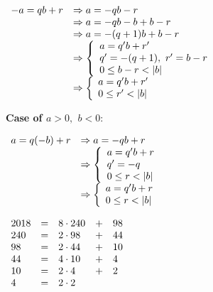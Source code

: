 \documentclass[a4paper, 11pt]{article}
\begin{document}
\begin{myEnumerate}
    \(
    \begin{array}{ll}
    	-a = qb + r & \Rightarrow a = -qb - r \\
        			& \Rightarrow a = -qb - b + b - r \\
                    & \Rightarrow a = -(q + 1)b + b - r \\
                    & \Rightarrow 
        \left\{
    		\begin{array}{ll}
        		a = q'b + r' \\
        		q' = -(q + 1), \textnormal{ } r' = b - r \\
                0 \leq b - r < |b|
    		\end{array}
		\right. \\
        			& \Rightarrow 
        \left\{
    		\begin{array}{ll}
        		a = q'b + r' \\
                0 \leq r' < |b|
    		\end{array}
		\right.
    \end{array} \\ \)

	\textbf{Case of $a > 0,$ $b < 0:$}
    
    \(
    \begin{array}{ll}
    	a = q(-b) + r & \Rightarrow a = -qb + r \\
                      & \Rightarrow 
        \left\{
    		\begin{array}{ll}
        		a = q'b + r \\
        		q' = -q \\
                0 \leq r < |b|
    		\end{array}
		\right. \\
        			& \Rightarrow 
        \left\{
    		\begin{array}{ll}
        		a = q'b + r \\
                0 \leq r < |b|
    		\end{array}
		\right.
    \end{array} \\ \)
    
	\item
	\begin{myEnumerate}
    	\item
        \( \\
        \begin{array}{lllll}
        	2018 & = & 8 \cdot 240 & + & 98 \\
        	240  & = & 2 \cdot 98  & + & 44 \\
            98   & = & 2 \cdot 44  & + & 10 \\
            44   & = & 4 \cdot 10  & + & 4 \\
            10   & = & 2 \cdot 4   & + & 2 \\
            4    & = & 2 \cdot 2
    	\end{array} \\ \)
        

\end{myEnumerate}
\end{myEnumerate}
\end{document}
